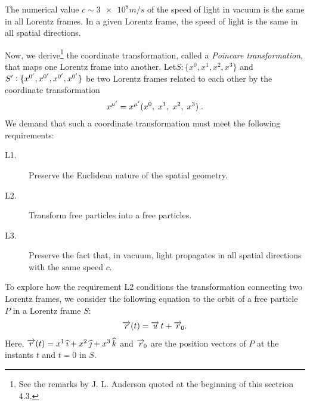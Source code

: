 \begin{small}
The 
numerical value $c \sim \num{3e8}\si{m/s}$ of the speed of 
light in vacuum  is the same in all Lorentz frames. In a 
given Lorentz frame, the speed of light is the same in all 
spatial directions. 

Now, we derive\footnote{See the remarks by J. L. Anderson 
quoted at the beginning of this sectrion 4.3.} the 
coordinate transformation, called a \textsl{Poincare 
transformation}, that maps one Lorentz frame into another. 
Let\break $S: \{ x^0,x^1,x^2,x^3\}$ and  ${S}': \{x^{{0'}}, 
x^{{0'}},  x^{{0'}},x^{{0'}}\}$ be two Lorentz frames related 
to each 
other by the coordinate  transformation
\begin{align}\label{str.2}
x^{{\mu'}} = x^{{\mu'}} ( x^0,\;x^1,\;x^2,\;x^3 )\;.
\end{align}
We demand that such a coordinate transformation must    
meet the following requirements:
\begin{description}
\item [L1.] {Preserve the Euclidean nature of the 
spatial  geometry}.
\item [L2.] {Transform free particles into a free
particles}.
\item [L3.] {Preserve the fact that, in vacuum, light 
propagates in all spatial directions with the same speed  
$c$}.
\end{description}

To explore how the requirement L2 conditions the  
transformation connecting two Lorentz frames, we consider 
the following equation to the orbit of a free particle $P$ 
in a Lorentz frame $S$: 
\begin{align}\label{str.3}
\overrightarrow{r}(t) = \overrightarrow{u}\, t + \overrightarrow{r}_{\negthinspace 0}.
\end{align}
Here, $\overrightarrow{r}(t)=x^1\,{\widehat{\imath}}+ x^2\,{\widehat{\jmath}}+x^3\,{\widehat{k}}$ and 
$\overrightarrow{r}_{\negthinspace 0}$ are  the position vectors of $P$ at the 
instants $t$ and $t=0$ in  $S$. 


\end{small}
